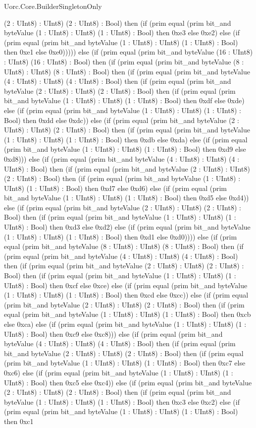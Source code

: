 \begin{lexlean}{Uorc.Core.BuilderSingletonOnly}
\begin{semanticmodule}
{(2 : UInt8) : UInt8) (2 : UInt8) : Bool) then (if (prim equal (prim bit_and byteValue (1 : UInt8) : UInt8) (1 : UInt8) : Bool) then 0xe3 else 0xe2) else (if (prim equal (prim bit_and byteValue (1 : UInt8) : UInt8) (1 : UInt8) : Bool) then 0xe1 else 0xe0))))) else (if (prim equal (prim bit_and byteValue (16 : UInt8) : UInt8) (16 : UInt8) : Bool) then (if (prim equal (prim bit_and byteValue (8 : UInt8) : UInt8) (8 : UInt8) : Bool) then (if (prim equal (prim bit_and byteValue (4 : UInt8) : UInt8) (4 : UInt8) : Bool) then (if (prim equal (prim bit_and byteValue (2 : UInt8) : UInt8) (2 : UInt8) : Bool) then (if (prim equal (prim bit_and byteValue (1 : UInt8) : UInt8) (1 : UInt8) : Bool) then 0xdf else 0xde) else (if (prim equal (prim bit_and byteValue (1 : UInt8) : UInt8) (1 : UInt8) : Bool) then 0xdd else 0xdc)) else (if (prim equal (prim bit_and byteValue (2 : UInt8) : UInt8) (2 : UInt8) : Bool) then (if (prim equal (prim bit_and byteValue (1 : UInt8) : UInt8) (1 : UInt8) : Bool) then 0xdb else 0xda) else (if (prim equal (prim bit_and byteValue (1 : UInt8) : UInt8) (1 : UInt8) : Bool) then 0xd9 else 0xd8))) else (if (prim equal (prim bit_and byteValue (4 : UInt8) : UInt8) (4 : UInt8) : Bool) then (if (prim equal (prim bit_and byteValue (2 : UInt8) : UInt8) (2 : UInt8) : Bool) then (if (prim equal (prim bit_and byteValue (1 : UInt8) : UInt8) (1 : UInt8) : Bool) then 0xd7 else 0xd6) else (if (prim equal (prim bit_and byteValue (1 : UInt8) : UInt8) (1 : UInt8) : Bool) then 0xd5 else 0xd4)) else (if (prim equal (prim bit_and byteValue (2 : UInt8) : UInt8) (2 : UInt8) : Bool) then (if (prim equal (prim bit_and byteValue (1 : UInt8) : UInt8) (1 : UInt8) : Bool) then 0xd3 else 0xd2) else (if (prim equal (prim bit_and byteValue (1 : UInt8) : UInt8) (1 : UInt8) : Bool) then 0xd1 else 0xd0)))) else (if (prim equal (prim bit_and byteValue (8 : UInt8) : UInt8) (8 : UInt8) : Bool) then (if (prim equal (prim bit_and byteValue (4 : UInt8) : UInt8) (4 : UInt8) : Bool) then (if (prim equal (prim bit_and byteValue (2 : UInt8) : UInt8) (2 : UInt8) : Bool) then (if (prim equal (prim bit_and byteValue (1 : UInt8) : UInt8) (1 : UInt8) : Bool) then 0xcf else 0xce) else (if (prim equal (prim bit_and byteValue (1 : UInt8) : UInt8) (1 : UInt8) : Bool) then 0xcd else 0xcc)) else (if (prim equal (prim bit_and byteValue (2 : UInt8) : UInt8) (2 : UInt8) : Bool) then (if (prim equal (prim bit_and byteValue (1 : UInt8) : UInt8) (1 : UInt8) : Bool) then 0xcb else 0xca) else (if (prim equal (prim bit_and byteValue (1 : UInt8) : UInt8) (1 : UInt8) : Bool) then 0xc9 else 0xc8))) else (if (prim equal (prim bit_and byteValue (4 : UInt8) : UInt8) (4 : UInt8) : Bool) then (if (prim equal (prim bit_and byteValue (2 : UInt8) : UInt8) (2 : UInt8) : Bool) then (if (prim equal (prim bit_and byteValue (1 : UInt8) : UInt8) (1 : UInt8) : Bool) then 0xc7 else 0xc6) else (if (prim equal (prim bit_and byteValue (1 : UInt8) : UInt8) (1 : UInt8) : Bool) then 0xc5 else 0xc4)) else (if (prim equal (prim bit_and byteValue (2 : UInt8) : UInt8) (2 : UInt8) : Bool) then (if (prim equal (prim bit_and byteValue (1 : UInt8) : UInt8) (1 : UInt8) : Bool) then 0xc3 else 0xc2) else (if (prim equal (prim bit_and byteValue (1 : UInt8) : UInt8) (1 : UInt8) : Bool) then 0xc1 }
\end{semanticmodule}
\end{lexlean}
